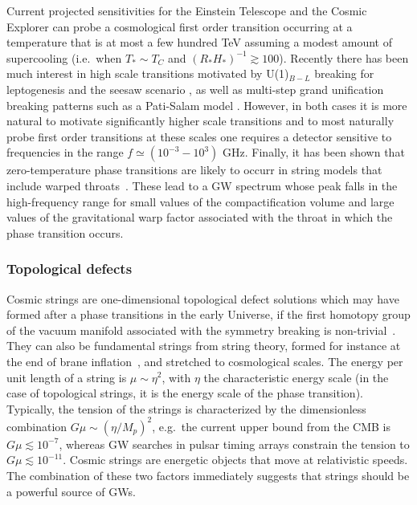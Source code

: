 \documentclass[11pt,a4paper]{article}
\begin{document}
Current projected sensitivities for the Einstein Telescope and the Cosmic Explorer can probe a cosmological first order transition occurring at a temperature that is at most a few hundred TeV assuming a modest amount of supercooling \cite{Evans:2016mbw,Punturo:2010zz,Hild:2010id} (i.e.\ when $T_\ast \sim T_C$ and $(R_\ast H_\ast )^{-1} \gtrsim 100$). Recently there has been much interest in high scale transitions motivated by U(1)$_{B-L}$ breaking for leptogenesis and the seesaw scenario \cite{Jinno:2016knw,Marzo:2018nov,Brdar:2018num,Okada:2018xdh,Hasegawa:2019amx,Okada:2020vvb}, as well as multi-step grand unification breaking patterns such as a Pati-Salam model \cite{Croon:2018kqn,Greljo:2019xan,Brdar:2019fur,Huang:2020bbe}. However, in both cases it is more natural to motivate significantly higher scale transitions and to most naturally probe first order transitions at these scales one requires a detector sensitive to frequencies in the range $f \simeq (10^{-3} - 10^3)$ GHz. Finally, it has been shown that zero-temperature phase transitions are likely to occurr in string models that include warped throats~\cite{GarciaGarcia:2016xgv}. These lead to a GW spectrum whose peak falls in the high-frequency range for small values of the compactification volume and large values of the gravitational warp factor associated with the throat in which the phase transition occurs. \par



\subsubsection{Topological defects }
\label{sec:TopologicalDefects}

Cosmic strings are one-dimensional topological defect solutions which may have formed after a phase transitions in the early Universe, if the first homotopy group of the vacuum manifold associated with the symmetry breaking is non-trivial~\cite{Kibble:1976sj,Jeannerot:2003qv}. They can also be fundamental strings from string theory, formed for instance at the end of brane inflation~\cite{Dvali:2003zj,Copeland:2003bj}, and stretched to cosmological scales. The energy per unit length of a string is $\mu \sim \eta^2$, with $\eta$ the characteristic energy scale (in the case of topological strings, it is the energy scale of the phase transition). Typically, the tension of the strings is characterized by the dimensionless combination $G\mu \sim (\eta/M_p)^2$, e.g.~the current upper bound from the CMB is $G\mu \lesssim 10^{-7}$, whereas GW searches in pulsar timing arrays constrain the tension to $G\mu \lesssim 10^{-11}$. Cosmic strings are energetic objects that move at relativistic speeds. The combination of these two factors immediately suggests that strings should be a powerful source of GWs.
\end{document}
